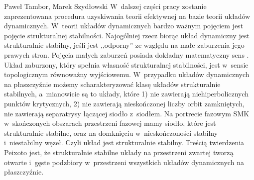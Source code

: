 \begin{artplenv2auth}{Paweł Tambor, Marek Szydłowski}
W~dalszej części pracy zostanie zaprezentowana procedura uzyskiwania teorii efektywnej na bazie teorii układów dynamicznych. W~teorii układów dynamicznych bardzo ważnym pojęciem jest pojęcie strukturalnej stabilności. Najogólniej rzecz biorąc układ dynamiczny jest strukturalnie stabilny, jeśli jest ,,odporny'' ze względu na małe zaburzenia jego prawych stron. Pojęcia małych zaburzeń posiada dokładny matematyczny sens
\parencite{tambor_czy_2017}.
Układ zaburzony, który spełnia własność strukturalnej stabilności, jest w~sensie topologicznym równoważny wyjściowemu. W~przypadku układów dynamicznych na płaszczyźnie możemy scharakteryzować klasę układów strukturalnie stabilnych, a~mianowicie są to układy, które 1) nie zawierają niehiperbolicznych punktów krytycznych, 2) nie zawierają nieskończonej liczby orbit zamkniętych, nie zawierają separatrysy łączącej siodło z~siodłem. Na portrecie fazowym SMK w~skończonych obszarach przestrzeni fazowej mamy siodło, które jest strukturalnie stabilne, oraz na domknięciu w~nieskończoności stabilny i~niestabilny węzeł. Czyli układ jest strukturalnie stabilny. Treścią twierdzenia Peixoto jest, że strukturalnie stabilne układy na przestrzeni zwartej tworzą otwarte i~gęste podzbiory w~przestrzeni wszystkich układów dynamicznych na płaszczyźnie.


\end{artplenv2auth}
